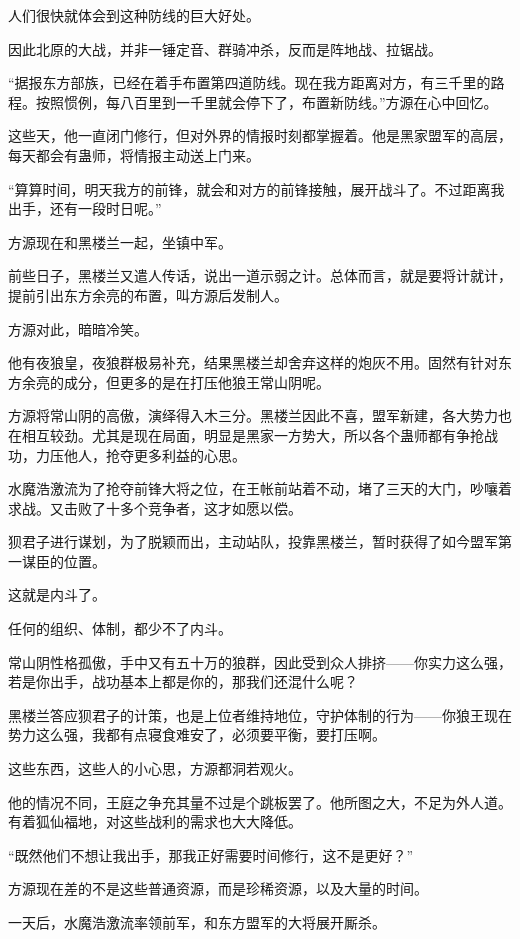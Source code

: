 \begin{this_body}
人们很快就体会到这种防线的巨大好处。

因此北原的大战，并非一锤定音、群骑冲杀，反而是阵地战、拉锯战。

“据报东方部族，已经在着手布置第四道防线。现在我方距离对方，有三千里的路程。按照惯例，每八百里到一千里就会停下了，布置新防线。”方源在心中回忆。

这些天，他一直闭门修行，但对外界的情报时刻都掌握着。他是黑家盟军的高层，每天都会有蛊师，将情报主动送上门来。

“算算时间，明天我方的前锋，就会和对方的前锋接触，展开战斗了。不过距离我出手，还有一段时日呢。”

方源现在和黑楼兰一起，坐镇中军。

前些日子，黑楼兰又遣人传话，说出一道示弱之计。总体而言，就是要将计就计，提前引出东方余亮的布置，叫方源后发制人。

方源对此，暗暗冷笑。

他有夜狼皇，夜狼群极易补充，结果黑楼兰却舍弃这样的炮灰不用。固然有针对东方余亮的成分，但更多的是在打压他狼王常山阴呢。

方源将常山阴的高傲，演绎得入木三分。黑楼兰因此不喜，盟军新建，各大势力也在相互较劲。尤其是现在局面，明显是黑家一方势大，所以各个蛊师都有争抢战功，力压他人，抢夺更多利益的心思。

水魔浩激流为了抢夺前锋大将之位，在王帐前站着不动，堵了三天的大门，吵嚷着求战。又击败了十多个竞争者，这才如愿以偿。

狈君子进行谋划，为了脱颖而出，主动站队，投靠黑楼兰，暂时获得了如今盟军第一谋臣的位置。

这就是内斗了。

任何的组织、体制，都少不了内斗。

常山阴性格孤傲，手中又有五十万的狼群，因此受到众人排挤——你实力这么强，若是你出手，战功基本上都是你的，那我们还混什么呢？

黑楼兰答应狈君子的计策，也是上位者维持地位，守护体制的行为——你狼王现在势力这么强，我都有点寝食难安了，必须要平衡，要打压啊。

这些东西，这些人的小心思，方源都洞若观火。

他的情况不同，王庭之争充其量不过是个跳板罢了。他所图之大，不足为外人道。有着狐仙福地，对这些战利的需求也大大降低。

“既然他们不想让我出手，那我正好需要时间修行，这不是更好？”

方源现在差的不是这些普通资源，而是珍稀资源，以及大量的时间。

一天后，水魔浩激流率领前军，和东方盟军的大将展开厮杀。


\end{this_body}
